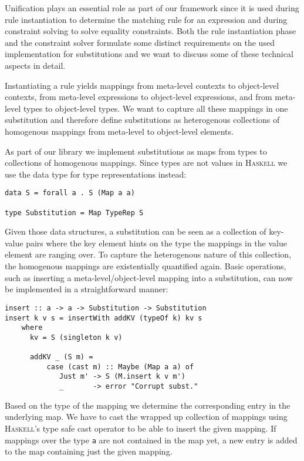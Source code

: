 Unification plays an essential role as part of our framework since it
is used during rule instantiation to determine the matching rule for
an expression and during constraint solving to solve equality
constraints. Both the rule instantiation phase and the constraint
solver formulate some distinct requirements on the used implementation
for substitutions and we want to discuss some of these technical
aspects in detail.

Instantiating a rule yields mappings from meta-level contexts to
object-level contexts, from meta-level expressions to object-level
expressions, and from meta-level types to object-level types. We want
to capture all these mappings in one substitution and therefore define
substitutions as heterogenous collections of homogenous mappings from
meta-level to object-level elements.

As part of our library we implement substitutions as maps from types
to collections of homogenous mappings. Since types are not values in
\textsc{Haskell} we use the data type for type representations
instead:
\begin{lstlisting}
data S = forall a . S (Map a a)

type Substitution = Map TypeRep S
\end{lstlisting}
Given those data structures, a substitution can be seen as a
collection of key-value pairs where the key element hints on the type
the mappings in the value element are ranging over. To capture the
heterogenous nature of this collection, the homogenous mappings are
existentially quantified again. Basic operations, such as inserting a
meta-level/object-level mapping into a substitution, can now be
implemented in a straightforward manner:
\begin{lstlisting}
insert :: a -> a -> Substitution -> Substitution
insert k v s = insertWith addKV (typeOf k) kv s
    where
      kv = S (singleton k v)

      addKV _ (S m) =
          case (cast m) :: Maybe (Map a a) of
             Just m' -> S (M.insert k v m')
             _       -> error "Corrupt subst."
\end{lstlisting}
Based on the type of the mapping we determine the corresponding entry
in the underlying map. We have to cast the wrapped up collection of
mappings using \textsc{Haskell}'s type safe cast operator to be able
to insert the given mapping. If mappings over the type \texttt{a} are
not contained in the map yet, a new entry is added to the map
containing just the given mapping.

